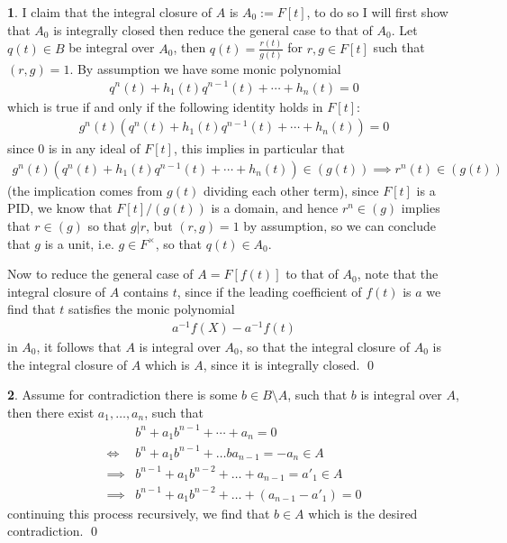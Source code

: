 \documentclass[11pt]{article}
\theoremstyle{definition}
\newtheorem{pb}{}
\begin{document}
    \begin{pb}
        I claim that the integral closure of \(A\) is \(A_0 := F[t]\), to do so I will first show that \(A_0\) is integrally closed then reduce the general case to that of \(A_0\). Let \(q(t) \in B\) be integral over \(A_0\), then \(q(t) = \frac{r(t)}{g(t)}\) for \(r,g \in F[t]\) such that \((r,g) = 1\). By assumption we have some monic polynomial
        \begin{align*}
            q^n(t) + h_1(t)q^{n-1}(t) + \cdots + h_n(t) = 0
        \end{align*}
        which is true if and only if the following identity holds in \(F[t]\):
        \begin{align*}
            g^n(t)(q^n(t) + h_1(t)q^{n-1}(t) + \cdots + h_n(t)) = 0
        \end{align*}
        since \(0\) is in any ideal of \(F[t]\), this implies in particular that
        \begin{align*}
            g^n(t)(q^n(t) + h_1(t)q^{n-1}(t) + \cdots + h_n(t)) \in (g(t)) \implies r^n(t) \in (g(t))
        \end{align*}
        (the implication comes from \(g(t)\) dividing each other term), since \(F[t]\) is a PID, we know that \(F[t]/(g(t))\) is a domain, and hence \(r^n \in (g)\) implies that \(r \in (g)\) so that \(g \vert r\), but \((r,g) = 1\) by assumption, so we can conclude that \(g\) is a unit, i.e. \(g \in F^\times\), so that \(q(t) \in A_0\). 
        
        Now to reduce the general case of \(A = F[f(t)]\) to that of \(A_0\), note that the integral closure of \(A\) contains \(t\), since if the leading coefficient of \(f(t)\) is \(a\) we find that \(t\) satisfies the monic polynomial
        \begin{align*}
            a^{-1}f(X) - a^{-1}f(t)
        \end{align*}
        in \(A_0\), it follows that \(A\) is integral over \(A_0\), so that the integral closure of \(A_0\) is the integral closure of \(A\) which is \(A\), since it is integrally closed. \qed
    \end{pb}
    \begin{pb}
        Assume for contradiction there is some \(b \in B \setminus A\), such that \(b\) is integral over \(A\), then there exist \(a_1,\hdots,a_n\), such that
        \begin{align*}
            &b^n + a_1 b^{n-1} + \cdots + a_n = 0 \\
            \iff &b^n + a_1b^{n-1} + \hdots ba_{n-1} = -a_n \in A \\
            \implies &b^{n-1} + a_1b^{n-2} + \hdots + a_{n-1} = a'_1 \in A \\
            \implies &b^{n-1} + a_1b^{n-2} + \hdots + (a_{n-1} - a'_1) = 0
        \end{align*}
        continuing this process recursively, we find that \(b \in A\) which is the desired contradiction. \qed
    \end{pb}
\end{document}
